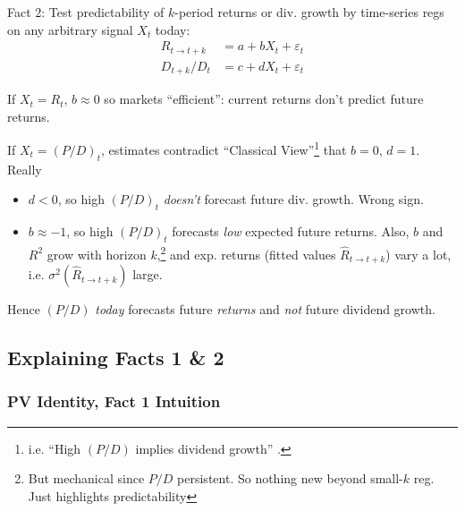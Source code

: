 \documentclass[12pt]{article}
\theoremstyle{plain}
\theoremstyle{definition}
\theoremstyle{remark}
\newcommand{\ra}{\rightarrow}
\begin{document}
\begin{multicols*}{2}
Fact 2:
Test predictability of $k$-period returns or div. growth by time-series
regs on any arbitrary signal $X_t$ today:
\begin{align*}
  R_{t\ra t+k} &= a + bX_t + \varepsilon_t \\
  D_{t+k}/D_t &= c + dX_t + \varepsilon_t
\end{align*}

If $X_t=R_t$, $b\approx 0$ so
markets ``efficient'': current returns don't predict future returns.

If $X_t=(P/D)_t$, estimates contradict ``Classical
View''\footnote{%
  i.e. ``High $(P/D)$ implies dividend growth'' .
}
that $b=0$, $d=1$. Really
\begin{itemize}
  \item
    $d<0$, so high $(P/D)_t$ \emph{doesn't} forecast future div. growth.
    Wrong sign.
  \item
    $b\approx -1$, so
    high $(P/D)_t$ forecasts \emph{low} expected future returns.
    Also, $b$ and $R^2$ grow with horizon $k$,\footnote{%
      But mechanical since $P/D$ persistent.
      So nothing new beyond small-$k$ reg.
      Just highlights predictability
    }
    and exp. returns (fitted values $\hat{R}_{t\ra t+k}$) vary a
    lot, i.e.  $\sigma^2(\hat{R}_{t\ra t+k})$ large.
\end{itemize}
Hence $(P/D)$ \emph{today} forecasts future \emph{returns} and
\emph{not} future dividend growth.


\columnbreak
\subsection{Explaining Facts 1 \& 2}

\subsubsection{PV Identity, Fact 1 Intuition}


\end{multicols*}
\end{document}
